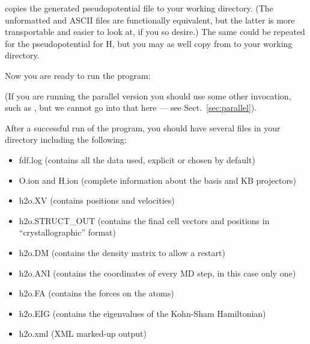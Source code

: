 
\noindent
copies the generated pseudopotential file to your working directory.
(The unformatted and ASCII files are functionally equivalent, but
the latter is more transportable and easier to look at, if you so
desire.) The same could be repeated for the pseudopotential for H,
but you may as well copy  from 
to your  working directory.

\noindent
Now you are ready to run the program:


\noindent
(If you are running the parallel version you should use some other
invocation, such as , but we cannot
go into that here --- see Sect.~\ref{sec:parallel}).

After a successful run of the program, you should have several
files in your directory including the following:
\begin{itemize}

\item fdf.log
 (contains all the data used, explicit or chosen by default)
\item O.ion and H.ion
 (complete information about the basis and KB projectors)
\item h2o.XV
 (contains positions and velocities)
\item h2o.STRUCT\_OUT
 (contains the final cell vectors and positions in
 ``crystallographic'' format)
\item h2o.DM
 (contains the density matrix to allow a restart)
\item h2o.ANI
 (contains the coordinates of every MD step, in this case only one)
\item h2o.FA
 (contains the forces on the atoms)
\item h2o.EIG
 (contains the eigenvalues of the Kohn-Sham Hamiltonian)
\item h2o.xml
 (XML marked-up output)
\end{itemize}

